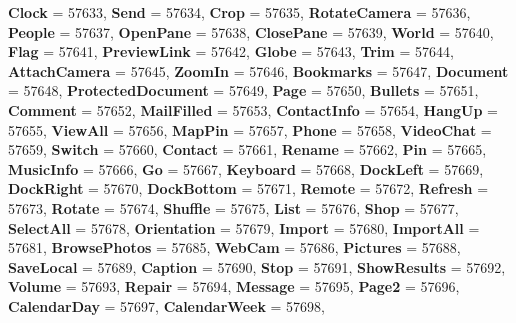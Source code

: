 \begin{DoxyCompactItemize}
{\bfseries Clock} = 57633, 
{\bfseries Send} = 57634, 
\newline
{\bfseries Crop} = 57635, 
{\bfseries Rotate\+Camera} = 57636, 
{\bfseries People} = 57637, 
{\bfseries Open\+Pane} = 57638, 
\newline
{\bfseries Close\+Pane} = 57639, 
{\bfseries World} = 57640, 
{\bfseries Flag} = 57641, 
{\bfseries Preview\+Link} = 57642, 
\newline
{\bfseries Globe} = 57643, 
{\bfseries Trim} = 57644, 
{\bfseries Attach\+Camera} = 57645, 
{\bfseries Zoom\+In} = 57646, 
\newline
{\bfseries Bookmarks} = 57647, 
{\bfseries Document} = 57648, 
{\bfseries Protected\+Document} = 57649, 
{\bfseries Page} = 57650, 
\newline
{\bfseries Bullets} = 57651, 
{\bfseries Comment} = 57652, 
{\bfseries Mail\+Filled} = 57653, 
{\bfseries Contact\+Info} = 57654, 
\newline
{\bfseries Hang\+Up} = 57655, 
{\bfseries View\+All} = 57656, 
{\bfseries Map\+Pin} = 57657, 
{\bfseries Phone} = 57658, 
\newline
{\bfseries Video\+Chat} = 57659, 
{\bfseries Switch} = 57660, 
{\bfseries Contact} = 57661, 
{\bfseries Rename} = 57662, 
\newline
{\bfseries Pin} = 57665, 
{\bfseries Music\+Info} = 57666, 
{\bfseries Go} = 57667, 
{\bfseries Keyboard} = 57668, 
\newline
{\bfseries Dock\+Left} = 57669, 
{\bfseries Dock\+Right} = 57670, 
{\bfseries Dock\+Bottom} = 57671, 
{\bfseries Remote} = 57672, 
\newline
{\bfseries Refresh} = 57673, 
{\bfseries Rotate} = 57674, 
{\bfseries Shuffle} = 57675, 
{\bfseries List} = 57676, 
\newline
{\bfseries Shop} = 57677, 
{\bfseries Select\+All} = 57678, 
{\bfseries Orientation} = 57679, 
{\bfseries Import} = 57680, 
\newline
{\bfseries Import\+All} = 57681, 
{\bfseries Browse\+Photos} = 57685, 
{\bfseries Web\+Cam} = 57686, 
{\bfseries Pictures} = 57688, 
\newline
{\bfseries Save\+Local} = 57689, 
{\bfseries Caption} = 57690, 
{\bfseries Stop} = 57691, 
{\bfseries Show\+Results} = 57692, 
\newline
{\bfseries Volume} = 57693, 
{\bfseries Repair} = 57694, 
{\bfseries Message} = 57695, 
{\bfseries Page2} = 57696, 
\newline
{\bfseries Calendar\+Day} = 57697, 
{\bfseries Calendar\+Week} = 57698, 

\end{DoxyCompactItemize}
